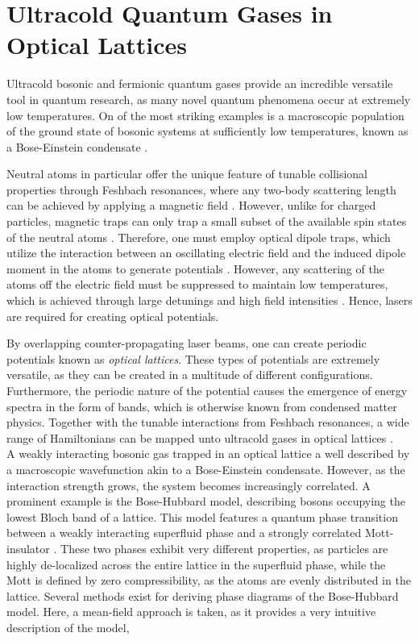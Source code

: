 \chapter{Ultracold Quantum Gases in Optical Lattices}

Ultracold bosonic and fermionic quantum gases provide an incredible versatile tool in quantum research, as many novel quantum phenomena occur at extremely low temperatures. On of the most striking examples is a macroscopic population of the ground state of bosonic systems at sufficiently low temperatures, known as a Bose-Einstein condensate \cite{WiemanCornell1995}.

Neutral atoms in particular offer the unique feature of tunable collisional properties through Feshbach resonances, where any two-body scattering length can be achieved by applying a magnetic field \cite{Inouye1998,Zwierlein2004}. However, unlike for charged particles, magnetic traps can only trap a small subset of the available spin states of the neutral atoms \cite{Bloch2005}. Therefore, one must employ optical dipole traps, which utilize the interaction between an oscillating electric field and the induced dipole moment in the atoms to generate potentials \cite{grimm}. However, any scattering of the atoms off the electric field must be suppressed to maintain low temperatures, which is achieved through large detunings and high field intensities \cite{manybodyBloch}. Hence, lasers are required for creating optical potentials.

By overlapping counter-propagating laser beams, one can create periodic potentials known as \textit{optical lattices}. These types of potentials are extremely versatile, as they can be created in a multitude of different configurations. Furthermore, the periodic nature of the potential causes the emergence of energy spectra in the form of bands, which is otherwise known from condensed matter physics. Together with the tunable interactions from Feshbach resonances, a wide range of Hamiltonians can be mapped unto ultracold gases in optical lattices \cite{JakschZoller, Bloch2012}.\\

A weakly interacting bosonic gas trapped in an optical lattice a well described by a macroscopic wavefunction akin to a Bose-Einstein condensate. However, as the interaction strength grows, the system becomes increasingly correlated. A prominent example is the Bose-Hubbard model, describing bosons occupying the lowest Bloch band of a lattice. This model features a quantum phase transition between a weakly interacting superfluid phase and a strongly correlated Mott-insulator \cite{Fisher1989}. These two phases exhibit very different properties, as  particles are highly de-localized across the entire lattice in the superfluid phase, while the Mott is defined by zero compressibility, as the atoms are evenly distributed in the lattice. Several methods exist for deriving phase diagrams of the Bose-Hubbard model. Here, a mean-field approach is taken, as it provides a very intuitive description of the model,


